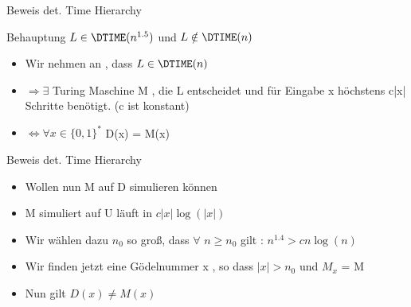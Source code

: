 \begin{frame}{Beweis det. Time Hierarchy}
	\begin{block}{Behauptung}
		$L \in \DTIME(n^{1.5})$ und $L \notin \DTIME(n)$
	\end{block}
	\pause
	\begin{itemize}
		\item Wir nehmen an , dass $L \in \DTIME(n)$
		\pause
		\item $\Rightarrow \exists$ Turing Maschine M , die L entscheidet und für Eingabe x  				höchstens c|x| Schritte benötigt. (c ist konstant)
		\pause
		\item $\Leftrightarrow \forall x \in {\lbrace 0,1 \rbrace }^{*}$ D(x) = M(x)
	\end{itemize}
\end{frame}

\begin{frame}{Beweis det. Time Hierarchy}
	\begin{itemize}
		\item Wollen nun M auf D simulieren können
		\pause
		\item M simuliert auf U läuft in $c|x|\log(|x|)$
		\pause		
		\item Wir wählen dazu $n_0$ so groß, dass $\forall$ $n \geq n_0$ gilt :
			$n^{1.4} > cn\log(n)$
		\pause		
		\item Wir finden jetzt eine Gödelnummer x , so dass $|x| > n_0$ und $M_x$ = M
		\pause
		\item Nun gilt $D(x) \neq M(x)$ \qedhere 
	\end{itemize}
\end{frame}

